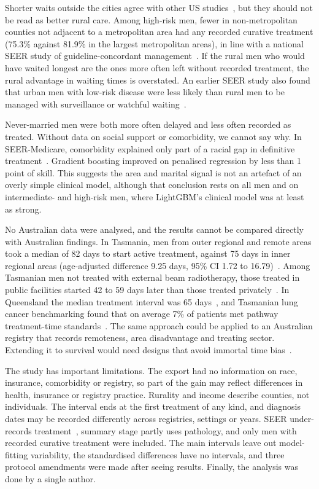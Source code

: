 \documentclass[10pt,a4paper,twocolumn]{article}
\begin{document}
Shorter waits outside the cities agree with other US studies~\cite{divanna2025,montielishino2021}, but they should not be read as better rural care. Among high-risk men, fewer in non-metropolitan counties not adjacent to a metropolitan area had any recorded curative treatment (75.3\% against 81.9\% in the largest metropolitan areas), in line with a national SEER study of guideline-concordant management~\cite{dirican2026}. If the rural men who would have waited longest are the ones more often left without recorded treatment, the rural advantage in waiting times is overstated. An earlier SEER study also found that urban men with low-risk disease were less likely than rural men to be managed with surveillance or watchful waiting~\cite{huang2023}.

Never-married men were both more often delayed and less often recorded as treated. Without data on social support or comorbidity, we cannot say why. In SEER-Medicare, comorbidity explained only part of a racial gap in definitive treatment~\cite{hammarlund2024}. Gradient boosting improved on penalised regression by less than 1 point of skill. This suggests the area and marital signal is not an artefact of an overly simple clinical model, although that conclusion rests on all men and on intermediate- and high-risk men, where LightGBM's clinical model was at least as strong.

No Australian data were analysed, and the results cannot be compared directly with Australian findings. In Tasmania, men from outer regional and remote areas took a median of 82 days to start active treatment, against 75 days in inner regional areas (age-adjusted difference 9.25 days, 95\% CI 1.72 to 16.79)~\cite{foley2022}. Among Tasmanian men not treated with external beam radiotherapy, those treated in public facilities started 42 to 59 days later than those treated privately~\cite{foley2025}. In Queensland the median treatment interval was 65 days~\cite{baade2012}, and Tasmanian lung cancer benchmarking found that on average 7\% of patients met pathway treatment-time standards~\cite{leong2025}. The same approach could be applied to an Australian registry that records remoteness, area disadvantage and treating sector. Extending it to survival would need designs that avoid immortal time bias~\cite{zheng2023}.

The study has important limitations. The export had no information on race, insurance, comorbidity or registry, so part of the gain may reflect differences in health, insurance or registry practice. Rurality and income describe counties, not individuals. The interval ends at the first treatment of any kind, and diagnosis dates may be recorded differently across registries, settings or years. SEER under-records treatment~\cite{noone2016}, summary stage partly uses pathology, and only men with recorded curative treatment were included. The main intervals leave out model-fitting variability, the standardised differences have no intervals, and three protocol amendments were made after seeing results. Finally, the analysis was done by a single author.
\end{document}
